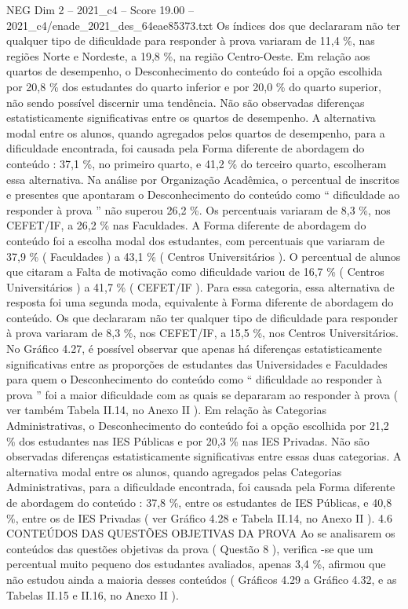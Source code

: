 \begin{textsample}{NEG Dim 2 – 2021\_c4 – Score 19.00 – 2021\_c4/enade\_2021\_des\_64eae85373.txt}
Os índices dos que declararam não ter qualquer tipo de dificuldade para responder à prova variaram de 11,4 \%, nas regiões Norte e Nordeste, a 19,8 \%, na região Centro-Oeste.
Em relação aos quartos de desempenho, o Desconhecimento do conteúdo foi a opção escolhida por 20,8 \% dos estudantes do quarto inferior e por 20,0 \% do quarto superior, não sendo possível discernir uma tendência.
Não são observadas diferenças estatisticamente significativas entre os quartos de desempenho.
A alternativa modal entre os alunos, quando agregados pelos quartos de desempenho, para a dificuldade encontrada, foi causada pela Forma diferente de abordagem do conteúdo : 37,1 \%, no primeiro quarto, e 41,2 \% do terceiro quarto, escolheram essa alternativa.
Na análise por Organização Acadêmica, o percentual de inscritos e presentes que apontaram o Desconhecimento do conteúdo como “ dificuldade ao responder à prova ” não superou 26,2 \%.
Os percentuais variaram de 8,3 \%, nos CEFET/IF, a 26,2 \% nas Faculdades.
A Forma diferente de abordagem do conteúdo foi a escolha modal dos estudantes, com percentuais que variaram de 37,9 \% ( Faculdades ) a 43,1 \% ( Centros Universitários ).
O percentual de alunos que citaram a Falta de motivação como dificuldade variou de 16,7 \% ( Centros Universitários ) a 41,7 \% ( CEFET/IF ).
Para essa categoria, essa alternativa de resposta foi uma segunda moda, equivalente à Forma diferente de abordagem do conteúdo.
Os que declararam não ter qualquer tipo de dificuldade para responder à prova variaram de 8,3 \%, nos CEFET/IF, a 15,5 \%, nos Centros Universitários.
No Gráfico 4.27, é possível observar que apenas há diferenças estatisticamente significativas entre as proporções de estudantes das Universidades e Faculdades para quem o Desconhecimento do conteúdo como “ dificuldade ao responder à prova ” foi a maior dificuldade com as quais se depararam ao responder à prova ( ver também Tabela II.14, no Anexo II ).
Em relação às Categorias Administrativas, o Desconhecimento do conteúdo foi a opção escolhida por 21,2 \% dos estudantes nas IES Públicas e por 20,3 \% nas IES Privadas.
Não são observadas diferenças estatisticamente significativas entre essas duas categorias.
A alternativa modal entre os alunos, quando agregados pelas Categorias Administrativas, para a dificuldade encontrada, foi causada pela Forma diferente de abordagem do conteúdo : 37,8 \%, entre os estudantes de IES Públicas, e 40,8 \%, entre os de IES Privadas ( ver Gráfico 4.28 e Tabela II.14, no Anexo II ). 4.6 CONTEÚDOS DAS QUESTÕES OBJETIVAS DA PROVA Ao se analisarem os conteúdos das questões objetivas da prova ( Questão 8 ), verifica -se que um percentual muito pequeno dos estudantes avaliados, apenas 3,4 \%, afirmou que não estudou ainda a maioria desses conteúdos ( Gráficos 4.29 a Gráfico 4.32, e as Tabelas II.15 e II.16, no Anexo II ).

\end{textsample}
